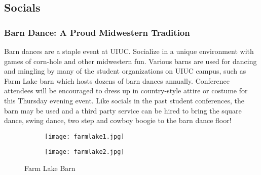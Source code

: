 \subsection{Socials}

\subsubsection{Barn Dance: A Proud Midwestern Tradition}
Barn dances are a staple event at UIUC. Socialize in a unique environment with games of corn-hole and other midwestern fun. Various barns are used for dancing and mingling by many of the student organizations on UIUC campus, such as Farm Lake barn which hosts dozens of barn dances annually. Conference attendees will be encouraged to dress up in country-style attire or costume for this Thursday evening event. Like socials in the past student conferences, the barn may be used and a third party service can be hired to bring the square dance, swing dance, two step and cowboy boogie to the barn dance floor! 
\vspace{0.5cm}\newline
\begin{figure}[H]
	\centering
	\begin{subfigure}{0.4\textwidth}
		\centering
		\texttt{[image: farmlake1.jpg]}
	\end{subfigure}%
	\begin{subfigure}{0.4\textwidth}
		\centering
		\texttt{[image: farmlake2.jpg]}
	\end{subfigure}	
	\caption{Farm Lake Barn}	
\end{figure} 


